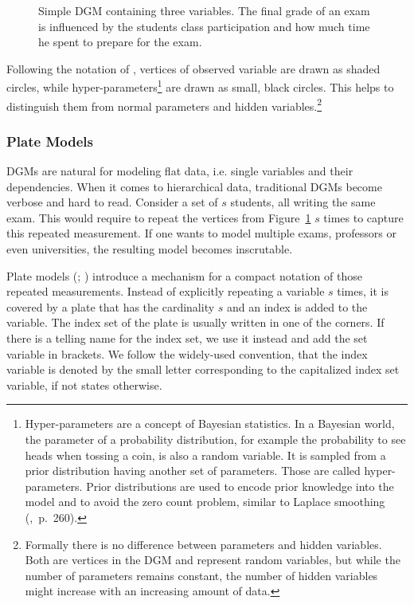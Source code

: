 \begin{figure}[t]
	\begin{center}
    	\scalebox{\tikzScale}{\adjustTikzSize }
	\end{center}
\caption[Simple directed graphical model containing three variables.]{Simple DGM containing three variables. The final grade of an exam is influenced by the students class participation and how much time he spent to prepare for the exam.}
		\label{fig:simple_dgm}
\end{figure}

Following the notation of \textcite{bishop2006pattern}, vertices of observed variable are drawn as shaded circles, while hyper-parameters\footnote{Hyper-parameters are a concept of Bayesian statistics. In a Bayesian world, the parameter of a probability distribution, for example the probability to see heads when tossing a coin, is also a random variable. It is sampled from a prior distribution having another set of parameters. Those are called hyper-parameters. Prior distributions are used to encode prior knowledge into the model and to avoid the zero count problem, similar to Laplace smoothing (\cite{manning2008introduction},~p.~260).} are drawn as small, black circles. This helps to distinguish them from normal parameters and hidden variables.\footnote{Formally there is no difference between parameters and hidden variables. Both are vertices in the DGM and represent random variables, but while the number of parameters remains constant, the number of hidden variables might increase with an increasing amount of data.}

\subsubsection{Plate Models}

DGMs are natural for modeling flat data, i.e. single variables and their dependencies. When it comes to hierarchical data, traditional DGMs become verbose and hard to read. Consider a set of $s$ students, all writing the same exam. This would require to repeat the vertices from Figure~\ref{fig:simple_dgm} $s$ times to capture this repeated measurement. If one wants to model multiple exams, professors or even universities, the resulting model becomes inscrutable.

Plate models (\cite{buntine1994operations}; \cite{gilks1994language}) introduce a mechanism for a compact notation of those repeated measurements. Instead of explicitly repeating a variable $s$ times, it is covered by a plate that has the cardinality $s$ and an index is added to the variable. The index set of the plate is usually written in one of the corners. If there is a telling name for the index set, we use it instead and add the set variable in brackets. We follow the widely-used convention, that the index variable is denoted by the small letter corresponding to the capitalized index set variable, if not states otherwise.

